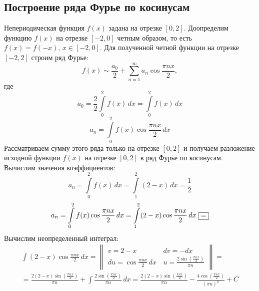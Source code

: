 \documentclass[a5paper, 10pt]{article}
\theoremstyle{definition}
\theoremstyle{plain}
\theoremstyle{remark}
\begin{document}
\subsection{Построение ряда Фурье по косинусам}
Непериодическая функция $f(x)$ задана на отрезке $[0, 2]$. Доопределим функцию $f(x)$ на отрезке $[-2, 0]$ четным образом, то есть $f(x) = f(-x), \, x \in [-2, 0]$. Для полученной четной функции на отрезке $[-2, 2]$ строим ряд Фурье:
\begin{equation*} 
f(x) \sim  \frac{a_0}{2} + \sum \limits_{n=1}^{\infty} a_n \cos \frac{\pi n x}{2},
\end{equation*}
где
\begin{equation*} 
a_0 = \frac{2}{2} \int \limits_{0}^{2} f(x) \, dx = \int \limits_{0}^{2} f(x) \, dx
\end{equation*}
\begin{equation*} 
a_n =  \int \limits_{0}^{2} f(x) \cos \frac{\pi n x}{2} \, dx
\end{equation*}
Рассматриваем сумму этого ряда только на отрезке $[0, 2]$ и получаем разложение исходной функции $f(x)$ на отрезке  $[0, 2]$ в ряд Фурье по косинусам.\\
Вычислим значения коэффициентов:
\begin{equation*} 
a_0 = \int \limits_{0}^{2} f(x) \, dx =  \int \limits_{1}^{2} (2-x) \, dx = \frac{1}{2}
\end{equation*}
\begin{equation*} 
a_n =  \int \limits_{0}^{2} f(x) \cos \frac{\pi n x}{2} \, dx = \int \limits_{1}^{2} (2-x) \cos \frac{\pi n x}{2} \, dx \, \, \fbox{=}
\end{equation*}
Вычислим неопределенный интеграл:
\begin{multline*} 
 \int  (2-x) \cos \frac{\pi n x}{2} \, dx = 
\begin{Vmatrix}
v = 2-x \, & dv = -dx\\
du =   \cos \frac{\pi n x}{2} \, dx \, & u = \frac{2 \sin \left( \frac{\pi n x}{2}\right)}{\pi n}
\end{Vmatrix}
=\\= \frac{2 (2-x) \sin \left( \frac{\pi n x}{2}\right)}{\pi n} + \int \frac{2 \sin \left( \frac{\pi n x}{2}\right)}{\pi n}  \, dx =
\frac{2 (2-x) \sin \left( \frac{\pi n x}{2}\right)}{\pi n} - \frac{4 \cos \left( \frac{\pi n x}{2} \right)}{(\pi n)^2} + C
\end{multline*}
\end{document}
